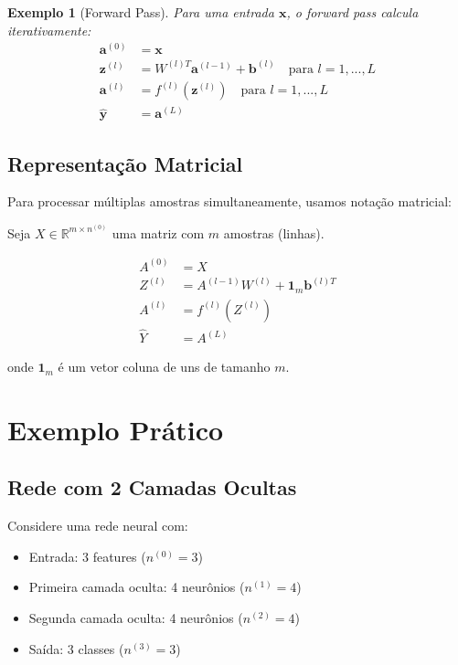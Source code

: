 \documentclass[a4paper,12pt]{article}
\newtheorem{exemplo}{Exemplo}[section]
\begin{document}
\begin{exemplo}[Forward Pass]
Para uma entrada $\mathbf{x}$, o forward pass calcula iterativamente:
\begin{align}
    \mathbf{a}^{(0)} &= \mathbf{x} \\
    \mathbf{z}^{(l)} &= W^{(l)T}\mathbf{a}^{(l-1)} + \mathbf{b}^{(l)} \quad \text{para } l = 1, ..., L \\
    \mathbf{a}^{(l)} &= f^{(l)}(\mathbf{z}^{(l)}) \quad \text{para } l = 1, ..., L \\
    \hat{\mathbf{y}} &= \mathbf{a}^{(L)}
\end{align}
\end{exemplo}

\subsection{Representação Matricial}

Para processar múltiplas amostras simultaneamente, usamos notação matricial:

Seja $X \in \mathbb{R}^{m \times n^{(0)}}$ uma matriz com $m$ amostras (linhas).

\begin{align}
    A^{(0)} &= X \\
    Z^{(l)} &= A^{(l-1)}W^{(l)} + \mathbf{1}_m\mathbf{b}^{(l)T} \\
    A^{(l)} &= f^{(l)}(Z^{(l)}) \\
    \hat{Y} &= A^{(L)}
\end{align}

onde $\mathbf{1}_m$ é um vetor coluna de uns de tamanho $m$.

\section{Exemplo Prático}

\subsection{Rede com 2 Camadas Ocultas}

Considere uma rede neural com:
\begin{itemize}
    \item Entrada: 3 features ($n^{(0)} = 3$)
    \item Primeira camada oculta: 4 neurônios ($n^{(1)} = 4$)
    \item Segunda camada oculta: 4 neurônios ($n^{(2)} = 4$)
    \item Saída: 3 classes ($n^{(3)} = 3$)
\end{itemize}
\end{document}
